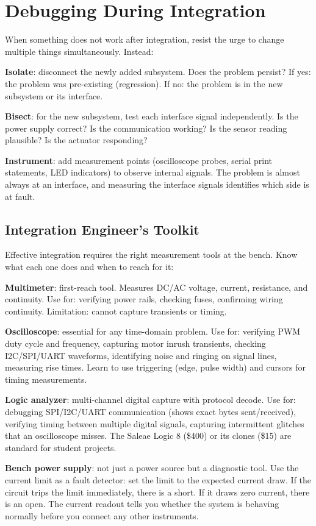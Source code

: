 \documentclass[11pt,letterpaper,twoside,openany]{book}
\begin{document}
\section{Debugging During Integration}
When something does not work after integration, resist the urge to change multiple things simultaneously. Instead:

\textbf{Isolate}: disconnect the newly added subsystem. Does the problem persist? If yes: the problem was pre-existing (regression). If no: the problem is in the new subsystem or its interface.

\textbf{Bisect}: for the new subsystem, test each interface signal independently. Is the power supply correct? Is the communication working? Is the sensor reading plausible? Is the actuator responding?

\textbf{Instrument}: add measurement points (oscilloscope probes, serial print statements, LED indicators) to observe internal signals. The problem is almost always at an interface, and measuring the interface signals identifies which side is at fault.

\subsection{Integration Engineer's Toolkit}
Effective integration requires the right measurement tools at the bench. Know what each one does and when to reach for it:

\textbf{Multimeter}: first-reach tool. Measures DC/AC voltage, current, resistance, and continuity. Use for: verifying power rails, checking fuses, confirming wiring continuity. Limitation: cannot capture transients or timing.

\textbf{Oscilloscope}: essential for any time-domain problem. Use for: verifying PWM duty cycle and frequency, capturing motor inrush transients, checking I2C/SPI/UART waveforms, identifying noise and ringing on signal lines, measuring rise times. Learn to use triggering (edge, pulse width) and cursors for timing measurements.

\textbf{Logic analyzer}: multi-channel digital capture with protocol decode. Use for: debugging SPI/I2C/UART communication (shows exact bytes sent/received), verifying timing between multiple digital signals, capturing intermittent glitches that an oscilloscope misses. The Saleae Logic 8 (\$400) or its clones (\$15) are standard for student projects.

\textbf{Bench power supply}: not just a power source but a diagnostic tool. Use the current limit as a fault detector: set the limit to the expected current draw. If the circuit trips the limit immediately, there is a short. If it draws zero current, there is an open. The current readout tells you whether the system is behaving normally before you connect any other instruments.
\end{document}
